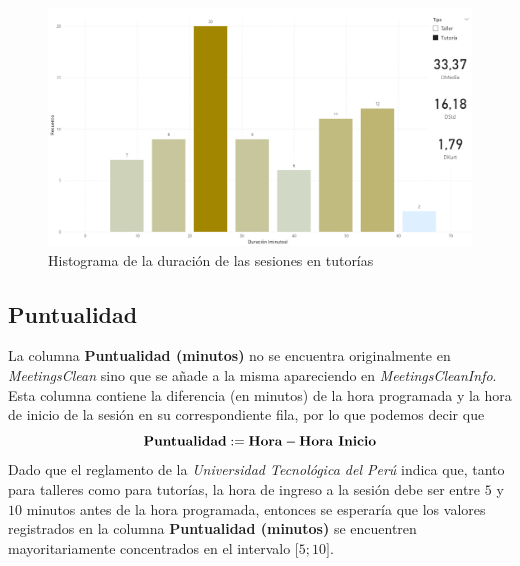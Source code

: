 \documentclass[11pt,a4paper]{book}
\theoremstyle{definition}%
\begin{document}
                \begin{figure}[H]
                    \centering
                    \includegraphics[width=1\textwidth]{Sources/histograma_DuracionTutoria.png}
                    \caption{Histograma de la duración de las sesiones en tutorías}
                \end{figure}
            \subsection{Puntualidad}
                La columna \textbf{Puntualidad (minutos)} no se encuentra originalmente en \textit{MeetingsClean} sino que se añade a la misma apareciendo en \textit{MeetingsCleanInfo}. Esta columna contiene la diferencia (en minutos) de la hora programada y la hora de inicio de la sesión en su correspondiente fila, por lo que podemos decir que 
                \begin{equation*}
                    \textup{\textbf{Puntualidad}}:=\textup{\textbf{Hora}}-\textup{\textbf{Hora Inicio}}
                \end{equation*}
                Dado que el reglamento de la \textit{Universidad Tecnológica del Perú} indica que, tanto para talleres como para tutorías, la hora de ingreso a la sesión debe ser entre $5$ y $10$ minutos antes de la hora programada, entonces se esperaría que los valores registrados en la columna \textbf{Puntualidad (minutos)} se encuentren mayoritariamente concentrados en el intervalo $\mathopen[5;10\mathclose]$.
                
\end{document}
